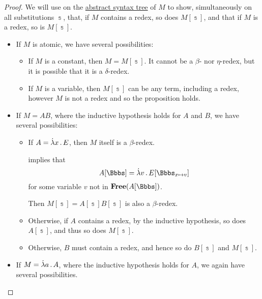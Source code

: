 \begin{proof}
   We will use  on the \hyperref[def:lambda_term_ast]{abstract syntax tree} of \( M \) to show, simultaneously on all substitutions \( \Bbbs \), that, if \( M \) contains a redex, so does \( M[\Bbbs] \), and that if \( M \) is a redex, so is \( M[\Bbbs] \).

  \begin{itemize}
    \item If \( M \) is atomic, we have several possibilities:
    \begin{itemize}
      \item If \( M \) is a constant, then \( M = M[\Bbbs] \). It cannot be a \( \beta \)- nor \( \eta \)-redex, but it is possible that it is a \( \delta \)-redex.

      \item If \( M \) is a variable, then \( M[\Bbbs] \) can be any term, including a redex, however \( M \) is not a redex and so the proposition holds.
    \end{itemize}

    \item If \( M = AB \), where the inductive hypothesis holds for \( A \) and \( B \), we have several possibilities:
    \begin{itemize}
      \item If \( A = \qabs x E \), then \( M \) itself is a \( \beta \)-redex.

       implies that
      \begin{equation*}
        A[\Bbbs] = \qabs v E[\Bbbs_{x \mapsto v}]
      \end{equation*}
      for some variable \( v \) not in \( \op*{Free}(A[\Bbbs]) \).

      Then \( M[\Bbbs] = A[\Bbbs] B[\Bbbs] \) is also a \( \beta \)-redex.

      \item Otherwise, if \( A \) contains a redex, by the inductive hypothesis, so does \( A[\Bbbs] \), and thus so does \( M[\Bbbs] \).

      \item Otherwise, \( B \) must contain a redex, and hence so do \( B[\Bbbs] \) and \( M[\Bbbs] \).
    \end{itemize}

    \item If \( M = \qabs a A \), where the inductive hypothesis holds for \( A \), we again have several possibilities.


\end{itemize}
\end{proof}
